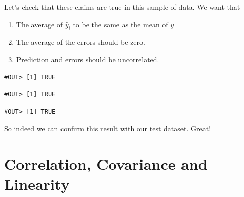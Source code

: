 \documentclass[]{book}
\newenvironment{Shaded}{\begin{snugshade}}{\end{snugshade}}
\newcommand{\KeywordTok}[1]{\textcolor[rgb]{0.13,0.29,0.53}{\textbf{#1}}}
\newcommand{\DecValTok}[1]{\textcolor[rgb]{0.00,0.00,0.81}{#1}}
\newcommand{\CommentTok}[1]{\textcolor[rgb]{0.56,0.35,0.01}{\textit{#1}}}
\newcommand{\OperatorTok}[1]{\textcolor[rgb]{0.81,0.36,0.00}{\textbf{#1}}}
\newcommand{\NormalTok}[1]{#1}
\providecommand{\tightlist}{%
  \setlength{\itemsep}{0pt}\setlength{\parskip}{0pt}}
\begin{document}
Let's check that these claims are true in this sample of data. We want
that

\begin{enumerate}
\def\labelenumi{\arabic{enumi}.}
\tightlist
\item
  The average of \(\hat{y}_i\) to be the same as the mean of \(y\)
\item
  The average of the errors should be zero.
\item
  Prediction and errors should be uncorrelated.
\end{enumerate}

\begin{Shaded}
\end{Shaded}

\begin{verbatim}
#OUT> [1] TRUE
\end{verbatim}

\begin{Shaded}
\end{Shaded}

\begin{verbatim}
#OUT> [1] TRUE
\end{verbatim}

\begin{Shaded}
\end{Shaded}

\begin{verbatim}
#OUT> [1] TRUE
\end{verbatim}

So indeed we can confirm this result with our test dataset. Great!

\section{Correlation, Covariance and
Linearity}\label{correlation-covariance-and-linearity}
\end{document}
